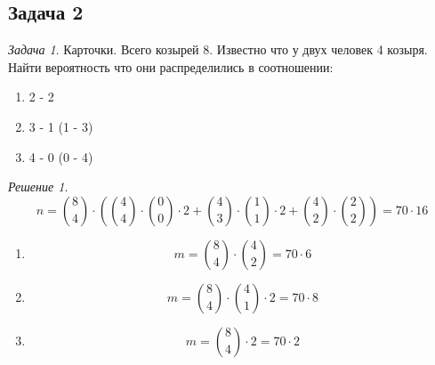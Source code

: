 \documentclass[english]{article}
\theoremstyle{plain}
\theoremstyle{remark}
\newtheorem*{task}{Задача}
\newtheorem*{solution}{Решение}
\theoremstyle{definition}
\begin{document}
\subsection{Задача 2}
\label{sec:orgdfc591e}
\begin{task}
Карточки. Всего козырей 8. Известно что у двух человек 4 козыря. Найти вероятность что они распределились в соотношении:
\begin{enumerate}
\item 2 - 2
\item 3 - 1 (1 - 3)
\item 4 - 0 (0 - 4)
\end{enumerate}
\end{task}
\begin{solution}
\[ n = \binom{8}{4}\cdot\left(\binom{4}{4}\cdot\binom{0}{0}\cdot 2 + \binom{4}{3}\cdot\binom{1}{1}\cdot2 + \binom{4}{2}\cdot\binom{2}{2}\right) = 70\cdot16 \]
\begin{enumerate}
\item \[ m = \binom{8}{4}\cdot\binom{4}{2} = 70\cdot6\]
\item \[ m = \binom{8}{4}\cdot\binom{4}{1}\cdot2 = 70\cdot8 \]
\item \[ m = \binom{8}{4}\cdot2 = 70\cdot2 \]
\end{enumerate}
\end{solution}
\end{document}
